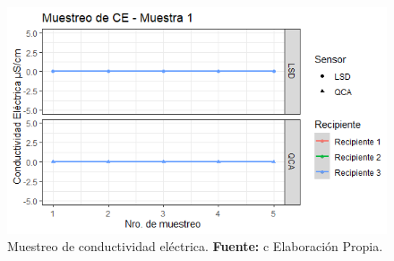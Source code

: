     \begin{figure}[H]
        \centering
        \includegraphics[width=0.75\linewidth]{Imagenes/cap4/CE_M1.png}
        \caption {Muestreo de conductividad el\'ectrica. \textbf{Fuente:}
c        Elaboraci\'on Propia. }
        \label{fig:M1CE}
    \end{figure}

